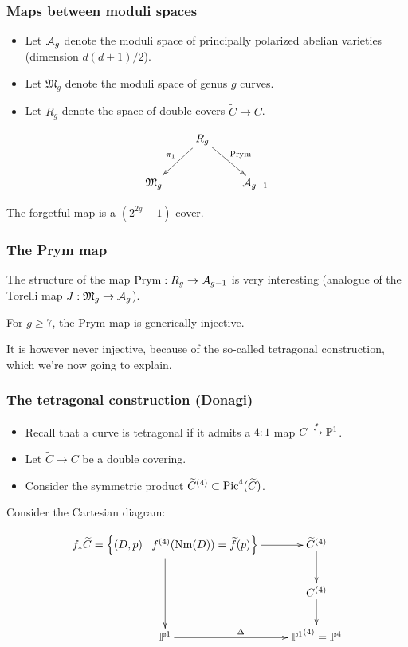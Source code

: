 \begin{frame}
\frametitle{Maps between moduli spaces}

\begin{itemize}
	\item Let $\A_g$ denote the moduli space of principally polarized abelian varieties (dimension $d(d+1)/2$).
	\pause
	\item Let $\mathfrak M_g$ denote the moduli space of genus $g$ curves.
	\pause
	\item Let $R_g$ denote the space of double covers $\widetilde C \to C$.
\end{itemize}
\pause


\begin{center}
\[
\xymatrix{
 & R_g \ar[dl]_{\pi_1} \ar[dr]^{\mathrm{Prym}}  & \\
\mathfrak M_g & & \A_{g-1}
}
\]
\end{center}

The forgetful map is a $(2^{2g}-1)$-cover. 

\end{frame}


\begin{frame}
\frametitle{The Prym map}

The structure of the map $\mathrm{Prym}:R_g \to \A_{g-1}$ is very interesting (analogue of the Torelli map $J:\mathfrak M_g \to \A_g$).

\pause

\begin{theorem}

For $g \geq 7$, the Prym map is generically injective. 

\end{theorem}
\pause

It is however \alert{never} injective, because of the so-called \alert{tetragonal construction}, which we're now going to explain.
\end{frame}

\begin{frame}
\frametitle{The tetragonal construction (Donagi)}

\begin{itemize}
	\item Recall that a curve is \alert{tetragonal} if it admits a $4:1$ map $C \xrightarrow{f} \P^1$.
	\pause
	\item Let $\widetilde C \to C$ be a double covering.
	\pause
	\item Consider the symmetric product ${\widetilde C}^{(4)} \subset \Pic^4(\widetilde C)$.
\end{itemize}
\pause

Consider the Cartesian diagram:

\[
\xymatrix{
f_\ast \widetilde C = \left\{ (D,p) \mid f^{(4)}(\Nm(D)) = \widetilde f (p) \right\} \ar[r] \ar[dd] & {\widetilde C}^{(4)} \ar[d] \\
 & C^{(4)} \ar[d] \\
\P^1 \ar[r]^\Delta & {\P^1}^{(4)} = \P^4
}
\]
\end{frame}

